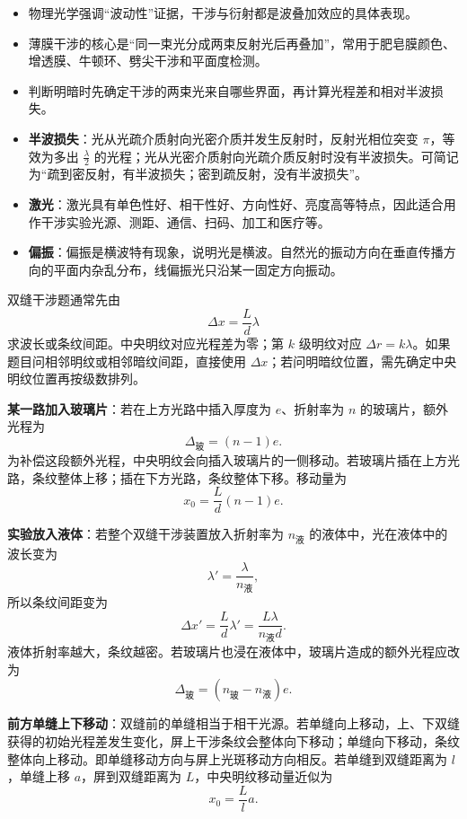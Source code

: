 \begin{keypointbox}
\begin{itemize}[leftmargin=1.5em]
  \item 物理光学强调“波动性”证据，干涉与衍射都是波叠加效应的具体表现。
  \item 薄膜干涉的核心是“同一束光分成两束反射光后再叠加”，常用于肥皂膜颜色、增透膜、牛顿环、劈尖干涉和平面度检测。
  \item 判断明暗时先确定干涉的两束光来自哪些界面，再计算光程差和相对半波损失。
  \item \textbf{半波损失}：光从光疏介质射向光密介质并发生反射时，反射光相位突变 $\pi$，等效为多出 $\frac{\lambda}{2}$ 的光程；光从光密介质射向光疏介质反射时没有半波损失。可简记为“疏到密反射，有半波损失；密到疏反射，没有半波损失”。
  \item \textbf{激光}：激光具有单色性好、相干性好、方向性好、亮度高等特点，因此适合用作干涉实验光源、测距、通信、扫码、加工和医疗等。
  \item \textbf{偏振}：偏振是横波特有现象，说明光是横波。自然光的振动方向在垂直传播方向的平面内杂乱分布，线偏振光只沿某一固定方向振动。
\end{itemize}
\end{keypointbox}

\begin{casetypebox}[title={\strut\textcolor{white}{\bfseries 常见题型：干涉}}]
双缝干涉题通常先由
\[
  \Delta x=\frac{L}{d}\lambda
\]
求波长或条纹间距。中央明纹对应光程差为零；第 $k$ 级明纹对应 $\Delta r=k\lambda$。如果题目问相邻明纹或相邻暗纹间距，直接使用 $\Delta x$；若问明暗纹位置，需先确定中央明纹位置再按级数排列。

\textbf{某一路加入玻璃片}：若在上方光路中插入厚度为 $e$、折射率为 $n$ 的玻璃片，额外光程为
\[
  \Delta_{\text{玻}}=(n-1)e.
\]
为补偿这段额外光程，中央明纹会向插入玻璃片的一侧移动。若玻璃片插在上方光路，条纹整体上移；插在下方光路，条纹整体下移。移动量为
\[
  x_0=\frac{L}{d}(n-1)e.
\]

\textbf{实验放入液体}：若整个双缝干涉装置放入折射率为 $n_{\text{液}}$ 的液体中，光在液体中的波长变为
\[
  \lambda'=\frac{\lambda}{n_{\text{液}}},
\]
所以条纹间距变为
\[
  \Delta x'=\frac{L}{d}\lambda'=\frac{L\lambda}{n_{\text{液}}d}.
\]
液体折射率越大，条纹越密。若玻璃片也浸在液体中，玻璃片造成的额外光程应改为
\[
  \Delta_{\text{玻}}=(n_{\text{玻}}-n_{\text{液}})e.
\]

\textbf{前方单缝上下移动}：双缝前的单缝相当于相干光源。若单缝向上移动，上、下双缝获得的初始光程差发生变化，屏上干涉条纹会整体向下移动；单缝向下移动，条纹整体向上移动。即单缝移动方向与屏上光斑移动方向相反。若单缝到双缝距离为 $l$，单缝上移 $a$，屏到双缝距离为 $L$，中央明纹移动量近似为
\[
  x_0=\frac{L}{l}a.
\]
\end{casetypebox}

